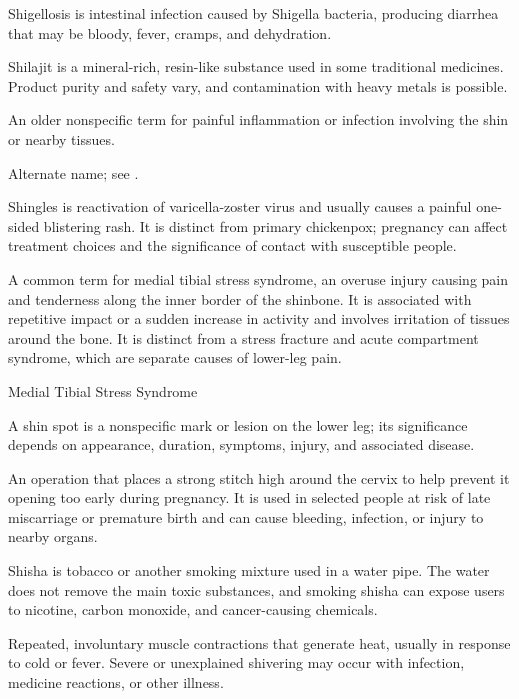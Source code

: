  Shigellosis is intestinal infection caused by Shigella bacteria, producing diarrhea that may be bloody, fever, cramps, and dehydration.

 Shilajit is a mineral-rich, resin-like substance used in some traditional medicines. Product purity and safety vary, and contamination with heavy metals is possible.

 An older nonspecific term for painful inflammation or infection involving the shin or nearby tissues.

 Alternate name; see .

 Shingles is reactivation of varicella-zoster virus and usually causes a painful one-sided blistering rash. It is distinct from primary chickenpox; pregnancy can affect treatment choices and the significance of contact with susceptible people.

 A common term for medial tibial stress syndrome, an overuse injury causing pain and tenderness along the inner border of the shinbone. It is associated with repetitive impact or a sudden increase in activity and involves irritation of tissues around the bone. It is distinct from a stress fracture and acute compartment syndrome, which are separate causes of lower-leg pain.

\synonyms
Medial Tibial Stress Syndrome

 A shin spot is a nonspecific mark or lesion on the lower leg; its significance depends on appearance, duration, symptoms, injury, and associated disease.

 An operation that places a strong stitch high around the cervix to help prevent it opening too early during pregnancy. It is used in selected people at risk of late miscarriage or premature birth and can cause bleeding, infection, or injury to nearby organs.

 Shisha is tobacco or another smoking mixture used in a water pipe. The water does not remove the main toxic substances, and smoking shisha can expose users to nicotine, carbon monoxide, and cancer-causing chemicals.

 Repeated, involuntary muscle contractions that generate heat, usually in response to cold or fever. Severe or unexplained shivering may occur with infection, medicine reactions, or other illness.

